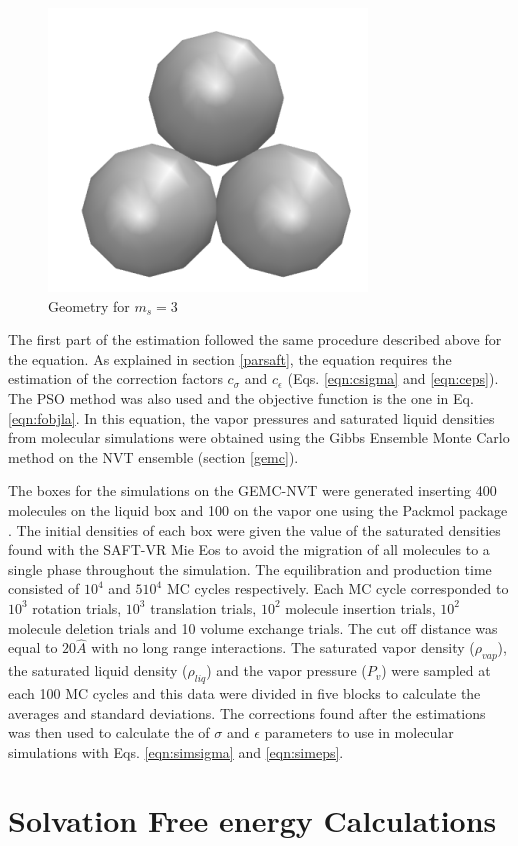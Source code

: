 \begin{figure}[th]
	\centering
	\includegraphics[width=0.15\linewidth]{Figures/fe3}
	\caption{Geometry for $m_{s}=3$}
	\label{fig:fen3}
\end{figure}

The first part of the estimation followed the same procedure described above for the  equation. As explained in section \ref{parsaft}, the  equation requires the estimation of the correction factors $c_{\sigma}$ and $c_{\epsilon}$ (Eqs. \eqref{eqn:csigma} and \eqref{eqn:ceps}). The PSO method was also used and the objective function is the one in Eq. \eqref{eqn:fobjla}. In this equation, the vapor pressures and saturated liquid densities from molecular simulations were obtained using the Gibbs Ensemble Monte Carlo method on the NVT ensemble  (section \ref{gemc}).

The boxes for the simulations on the GEMC-NVT were generated inserting 400 molecules on the liquid box and 100 on the vapor one using the Packmol package \cite{packmol}. The initial densities of each box were given the value of the saturated densities found with the SAFT-VR Mie Eos to avoid the migration of all molecules to a single phase throughout the simulation. The equilibration and production time consisted of $10^{4}$ and $5 10^{4}$ MC cycles respectively. Each MC cycle corresponded to $10^3$ rotation trials, $10^3$ translation trials, $10^2$ molecule insertion trials, $10^2$ molecule deletion trials and 10 volume exchange trials. The cut off distance was equal to $20 \hat{A}$ with no long range interactions. The saturated vapor density ($\rho_{vap}$), the saturated liquid density ($\rho_{liq}$) and the vapor pressure ($P_{v}$) were sampled at each 100 MC cycles and this data were divided in five blocks to calculate the averages and standard deviations. The corrections found after the estimations was then used to calculate the of $\sigma$ and $\epsilon$ parameters to use in molecular simulations with Eqs. \eqref{eqn:simsigma} and \eqref{eqn:simeps}.

\section{Solvation Free energy Calculations}\label{solvme}

